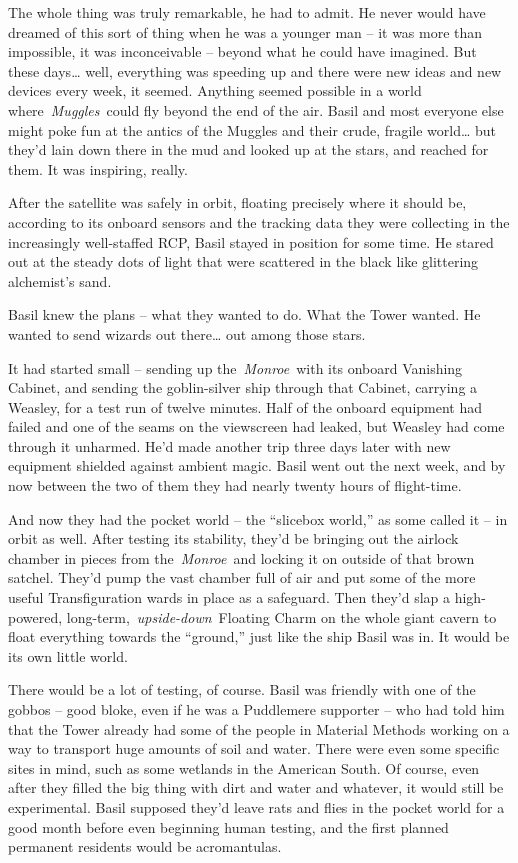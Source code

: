The whole thing was truly remarkable, he had to admit. He never would
have dreamed of this sort of thing when he was a younger man -- it was
more than impossible, it was inconceivable -- beyond what he could have
imagined. But these days\ldots{} well, everything was speeding up and
there were new ideas and new devices every week, it seemed. Anything
seemed possible in a world where~\emph{Muggles}~could fly beyond the end
of the air. Basil and most everyone else might poke fun at the antics of
the Muggles and their crude, fragile world\ldots{} but they'd lain down
there in the mud and looked up at the stars, and reached for them. It
was inspiring, really.

After the satellite was safely in orbit, floating precisely where it
should be, according to its onboard sensors and the tracking data they
were collecting in the increasingly well-staffed RCP, Basil stayed in
position for some time. He stared out at the steady dots of light that
were scattered in the black like glittering alchemist's sand.

Basil knew the plans -- what they wanted to do. What the Tower wanted.
He wanted to send wizards out there\ldots{} out among those stars.

It had started small -- sending up the~\emph{Monroe}~with its onboard
Vanishing Cabinet, and sending the goblin-silver ship through that
Cabinet, carrying a Weasley, for a test run of twelve minutes. Half of
the onboard equipment had failed and one of the seams on the viewscreen
had leaked, but Weasley had come through it unharmed. He'd made another
trip three days later with new equipment shielded against ambient magic.
Basil went out the next week, and by now between the two of them they
had nearly twenty hours of flight-time.

And now they had the pocket world -- the ``slicebox world,'' as some
called it -- in orbit as well. After testing its stability, they'd be
bringing out the airlock chamber in pieces from the~\emph{Monroe}~and
locking it on outside of that brown satchel. They'd pump the vast
chamber full of air and put some of the more useful Transfiguration
wards in place as a safeguard. Then they'd slap a high-powered,
long-term,~\emph{upside-down}~Floating Charm on the whole giant cavern
to float everything towards the ``ground,'' just like the ship Basil was
in. It would be its own little world.

There would be a lot of testing, of course. Basil was friendly with one
of the gobbos -- good bloke, even if he was a Puddlemere supporter --
who had told him that the Tower already had some of the people in
Material Methods working on a way to transport huge amounts of soil and
water. There were even some specific sites in mind, such as some
wetlands in the American South. Of course, even after they filled the
big thing with dirt and water and whatever, it would still be
experimental. Basil supposed they'd leave rats and flies in the pocket
world for a good month before even beginning human testing, and the
first planned permanent residents would be acromantulas.

